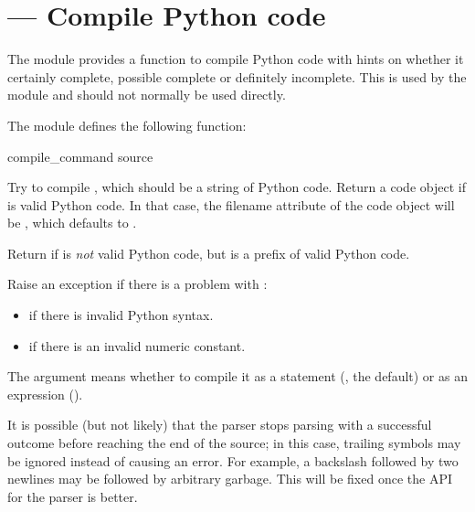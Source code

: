 \section{ ---
         Compile Python code}


The  module provides a function to compile Python code
with hints on whether it certainly complete, possible complete or
definitely incomplete.  This is used by the  module
and should not normally be used directly.

The  module defines the following function:

\begin{funcdesc}{compile_command}
                {source}

Try to compile , which should be a string of Python
code. Return a code object if  is valid
Python code. In that case, the filename attribute of the code object
will be , which defaults to .

Return  if  is \emph{not} valid Python
code, but is a prefix of valid Python code.

Raise an exception if there is a problem with :
\begin{itemize}
        \item {}
              if there is invalid Python syntax.
        \item {}
              if there is an invalid numeric constant.
\end{itemize}

The  argument means whether to compile it as a statement
(, the default) or as an expression ().

It is possible (but not likely) that the parser stops parsing
with a successful outcome before reaching the end of the source;
in this case, trailing symbols may be ignored instead of causing an
error.  For example, a backslash followed by two newlines may be
followed by arbitrary garbage.  This will be fixed once the API
for the parser is better.
\end{funcdesc}
